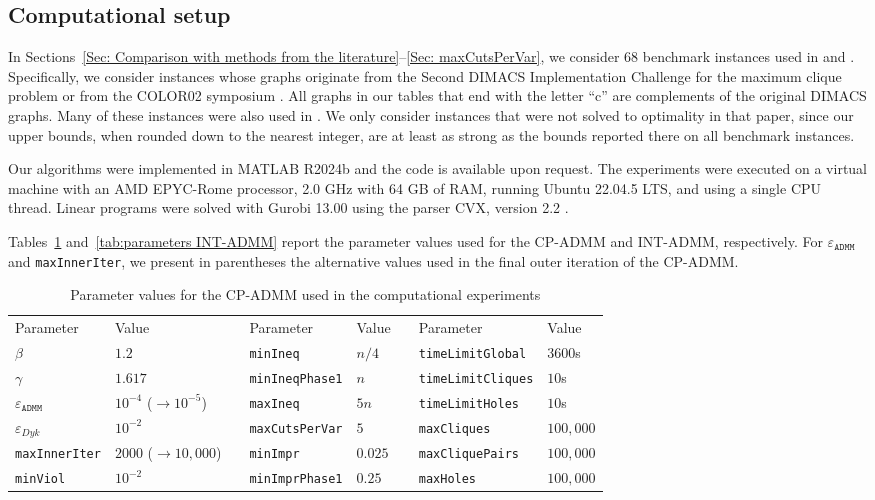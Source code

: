 \documentclass[11pt, a4paper]{article}
\newcommand{\eps}{\varepsilon}
\begin{document}
\subsection{Computational setup} \label{Sec: Computational setup}
In Sections~\ref{Sec: Comparison with methods from the literature}--\ref{Sec: maxCutsPerVar}, we consider 68 benchmark instances used in \cite{Campelo2010ILPLagr} and \cite{Januschowski2011ILPSym}.
Specifically, we consider instances whose graphs originate from the Second DIMACS Implementation Challenge for the maximum clique problem \citep{Johnson1996DIMACS} or from the COLOR02 symposium \citep{Johnson2002COLOR02}.
All graphs in our tables that end with the letter ``c'' are complements of the original DIMACS graphs.
Many of these instances were also used in \cite{Kuryatnikova2022MkCSProblem}. 
We only consider instances that were not solved to optimality in that paper, since our upper bounds, when rounded down to the nearest integer, are at least as strong as the bounds reported there on all benchmark instances.

Our algorithms were implemented in MATLAB R2024b and the code is available upon request.
The experiments were executed on a virtual machine with an AMD EPYC-Rome processor, 2.0 GHz with 64 GB of RAM, running Ubuntu 22.04.5 LTS, and using a single CPU thread.
Linear programs were solved with Gurobi 13.00 using the parser CVX, version 2.2 \cite{CVX}.

Tables~\ref{tab:parameters CP-ADMM} and~\ref{tab:parameters INT-ADMM} report the parameter values used for the CP-ADMM and INT-ADMM, respectively.
For $\eps_\texttt{ADMM}$ and \texttt{maxInnerIter}, we present in parentheses the alternative values used in the final outer iteration of the CP-ADMM.

\begin{table}[H]
\centering
\caption{Parameter values for the CP-ADMM used in the computational experiments}
\label{tab:parameters CP-ADMM}
\begin{tabular}{@{}llllllll@{}}
\toprule
Parameter & Value &  & Parameter & Value &  & Parameter & Value \\ \cmidrule(r){1-2} \cmidrule(lr){4-5} \cmidrule(l){7-8} 
$\beta$ & $1.2$ &  & \texttt{minIneq} & $n/4$ &  & \texttt{timeLimitGlobal} & $3600$s \\
$\gamma$ & $1.617$ &  & \texttt{minIneqPhase1} & $n$ &  & \texttt{timeLimitCliques} & $10$s \\
$\eps_\texttt{ADMM}$ & $10^{-4}$ ($\to 10^{-5}$) &  & \texttt{maxIneq} & $5n$ &  & \texttt{timeLimitHoles} & $10$s \\
$\eps_{Dyk}$ & $10^{-2}$ &  & \texttt{maxCutsPerVar} & $5$ &  & \texttt{maxCliques} & $100{,}000$ \\
\texttt{maxInnerIter} & $2000$ ($\to 10{,}000$) &  & \texttt{minImpr} & $0.025$ &  & \texttt{maxCliquePairs} & $100{,}000$ \\
\texttt{minViol} & $10^{-2}$ &  & \texttt{minImprPhase1} & $0.25$ &  & \texttt{maxHoles} & $100{,}000$ \\ \bottomrule
\end{tabular}
\end{table}
\end{document}
